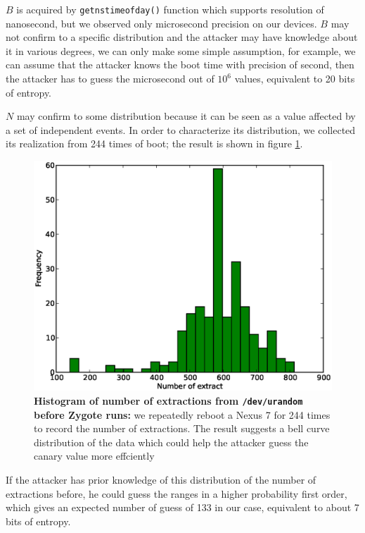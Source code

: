 $B$ is acquired by \verb|getnstimeofday()| function which supports resolution of nanosecond, but we observed only microsecond precision on our devices.
$B$ may not confirm to a specific distribution and the attacker may have knowledge about it in various degrees, we can only make some simple assumption, for example, we can assume that the attacker knows the boot time with precision of second, then the attacker has to guess the microsecond out of $10^6$ values, equivalent to 20 bits of entropy.

$N$ may confirm to some distribution because it can be seen as a value affected by a set of independent events. In order to characterize its distribution, we collected its realization from 244 times of boot; the result is shown in figure \ref{fighist}.

\begin{figure}[t]
\begin{center}
\includegraphics[scale=0.4]{hist.eps}
\end{center}
\caption{{\bf Histogram of number of extractions from \texttt{/dev/urandom} before Zygote runs:} we repeatedly reboot a Nexus 7 for 244 times to record the number of extractions. The result suggests a bell curve distribution of the data which could help the attacker guess the canary value more effciently }
\label{fighist}
\end{figure}

If the attacker has prior knowledge of this distribution of the number of extractions before, he could guess the ranges in a higher probability first order, which gives an expected number of guess of 133 in our case, equivalent to about 7 bits of entropy.

